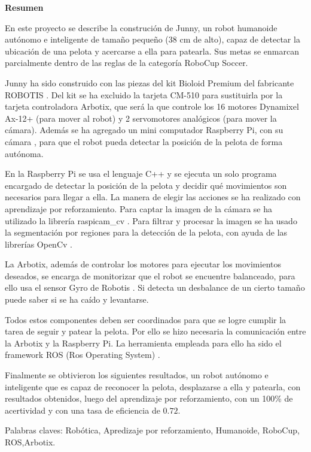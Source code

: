 \setcounter{page}{4}
\begin{center}
	{\bf Resumen}  %
\end{center}	


En este proyecto se describe la construción de Junny, un robot humanoide autónomo e inteligente de tamaño pequeño (38 cm de alto), capaz de detectar la ubicación de una pelota y acercarse a ella para patearla. Sus metas se enmarcan parcialmente dentro de las reglas de la categoría RoboCup Soccer.

Junny ha sido construido con las piezas del kit Bioloid Premium \cite{robotics} del fabricante ROBOTIS \cite{robotics1}. Del kit se ha excluido la tarjeta CM-510 para sustituirla por la tarjeta controladora Arbotix, que será la que controle los 16 motores Dynamixel Ax-12+ (para mover al robot) y 2 servomotores analógicos (para mover la cámara). Además se ha agregado un mini computador Raspberry Pi, con su cámara \cite{raspberrycam}, para que el robot pueda detectar la posición de la pelota de forma autónoma. 

En la Raspberry Pi se usa el lenguaje C++ y se ejecuta un solo programa encargado de detectar la posición de la pelota y decidir qué movimientos son necesarios para llegar a ella. La manera de elegir las acciones se ha realizado con aprendizaje por reforzamiento. Para captar la imagen de la cámara se ha utilizado la librería raspicam\_cv \cite{camara}. Para filtrar y procesar la imagen se ha usado la segmentaci\'on por regiones para la detecci\'on de la pelota, con ayuda de las librerías OpenCv \cite{opencv}. 

La Arbotix, además de controlar los motores para ejecutar los movimientos deseados, se encarga de monitorizar que el robot se encuentre balanceado, para ello usa el sensor Gyro de Robotis \cite{gyro}. Si detecta un desbalance de un cierto tamaño puede saber si se ha caído y levantarse.

Todos estos componentes deben ser coordinados para que se logre cumplir la tarea de seguir y patear la pelota. Por ello se hizo necesaria la comunicación entre la Arbotix y la Raspberry Pi. La herramienta 
empleada para ello ha sido el framework ROS (Ros Operating System) \cite{ros}. 

Finalmente se obtivieron los siguientes resultados, un robot aut\'onomo e inteligente que es capaz de reconocer la pelota, desplazarse a ella y patearla, con resultados obtenidos, luego del aprendizaje por reforzamiento, con un 100\% de acertividad y con una tasa de eficiencia de $0.72$.

Palabras claves: Rob\'otica, Apredizaje por reforzamiento, Humanoide, RoboCup, ROS,Arbotix.